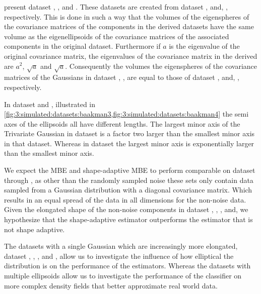  present dataset \baakmanOne, \baakmanTwo, and \baakmanThree. These datasets are created from dataset \numberstringnum{\ferdosiOneNum}, \numberstringnum{\ferdosiTwoNum} and, \numberstringnum{\ferdosiThreeNum}, respectively. This is done in such a way that the volumes of the eigenspheres of the covariance matrices of the components in the derived datasets have the same volume as the eigenellipsoids of the covariance matrices of the associated components in the original dataset. Furthermore if $a$ is the eigenvalue of the original covariance matrix, the eigenvalues of the covariance matrix in the derived are $a^2$, $\sqrt{a}$ and $\sqrt{a}$. Consequently the volumes the eigenspheres of the covariance matrices of the Gaussians in dataset \numberstringnum{\baakmanOneNum}, \numberstringnum{\baakmanTwoNum}, \numberstringnum{\baakmanThreeNum} are equal to those of dataset \numberstringnum{\ferdosiOneNum},  \numberstringnum{\ferdosiOneNum} and, \numberstringnum{\ferdosiThreeNum}, respectively.

In dataset \numberstringnum{\baakmanFourNum} and \numberstringnum{\baakmanFiveNum}, illustrated in \cref{fig:3:simulated:datasets:baakman3,fig:3:simulated:datasets:baakman4} the semi axes of the ellipsoids all have different lengths. The largest minor axis of the Trivariate Gaussian in dataset \numberstringnum{\baakmanFourNum} is a factor two larger than the smallest minor axis in that dataset. Whereas in dataset \numberstringnum{\baakmanFiveNum} the largest minor axis is exponentially larger than the smallest minor axis. 

We expect the MBE and shape-adaptive MBE to perform comparable on dataset \numberstringnum{\ferdosiOneNum} through \numberstringnum{\ferdosiThreeNum}, as other than the randomly sampled noise these sets only contain data sampled from a Gaussian distribution with a diagonal covariance matrix. Which results in an equal spread of the data in all dimensions for the non-noise data. 
Given the elongated shape of the non-noise components in dataset \numberstringnum{\baakmanOneNum}, \numberstringnum{\baakmanTwoNum}, \numberstringnum{\baakmanThreeNum}, \numberstringnum{\baakmanFourNum} and, \numberstringnum{\baakmanFiveNum} we hypothesize that the shape-adaptive estimator outperforms the estimator that is not shape adaptive.

The datasets with a single Gaussian which are increasingly more elongated, \ie dataset \ferdosiOne, \baakmanOne, \baakmanFour, and \baakmanFive, allow us to investigate the influence of how elliptical the distribution is on the performance of the estimators. Whereas the datasets with multiple ellipsoids allow us to investigate the performance of the classifier on more complex density fields that better approximate real world data. 